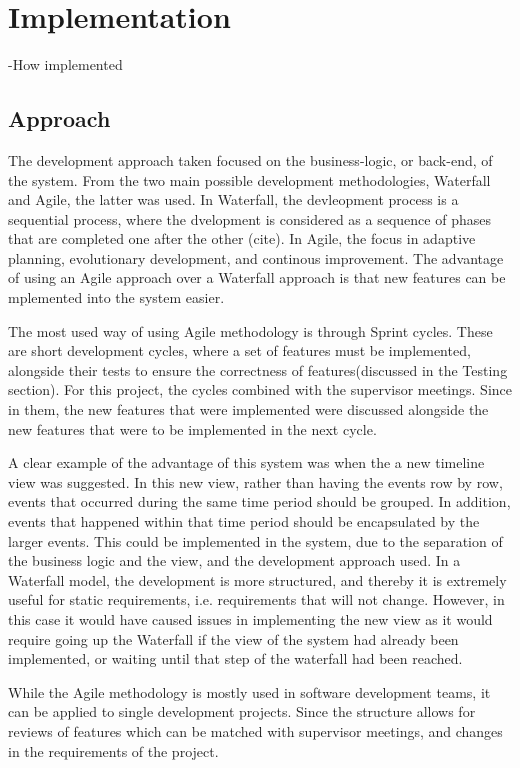 \chapter{Implementation}
-How implemented
\section{Approach}
\par The development approach taken focused on the business-logic, or back-end, of the system. From the two main possible development methodologies, Waterfall and Agile, the latter was used. In Waterfall, the devleopment process is a sequential process, where the dvelopment is considered as a sequence of phases that are completed one after the other (cite). In Agile, the focus in adaptive planning, evolutionary development, and continous improvement. The advantage of using an Agile approach over a Waterfall approach is that new features can be mplemented into the system easier. 
\par The most used way of using Agile methodology is through Sprint cycles. These are short development cycles, where a set of features must be implemented, alongside their tests to ensure the correctness of features(discussed in the Testing section). For this project, the cycles combined with the supervisor meetings. Since in them, the new features that were implemented were discussed alongside the new features that were to be implemented in the next cycle. 
\par A clear example of the advantage of this system was when the a new timeline view was suggested. In this new view, rather than having the events row by row, events that occurred during the same time period should be grouped. In addition, events that happened within that time period should be encapsulated by the larger events. This could be implemented in the system, due to the separation of the business logic and the view, and the development approach used. In a Waterfall model, the development is more structured, and thereby it is extremely useful for static requirements, i.e. requirements that will not change. However, in this case it would have caused issues in implementing the new view as it would require going up the Waterfall if the view of the system had already been implemented, or waiting until that step of the waterfall had been reached.
\par While the Agile methodology is mostly used in software development teams, it can be applied to single development projects. Since the structure allows for reviews of features which can be matched with supervisor meetings, and changes in the requirements of the project.
